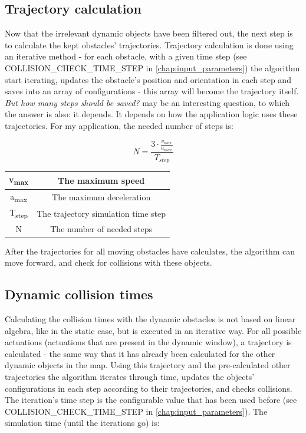 \subsection{Trajectory calculation}
\label{trajectory_calculation}
Now that the irrelevant dynamic objects have been filtered out, the next step is to calculate the kept obstacles' trajectories. Trajectory calculation is done using an iterative method - for each obstacle, with a given time step (see COLLISION\_CHECK\_TIME\_STEP in \ref{chap:input_parameters}) the algorithm start iterating, updates the obstacle's position and orientation in each step and saves into an array of configurations - this array will become the trajectory itself. \textit{But how many steps should be saved?} may be an interesting question, to which the answer is also: it depends. It depends on how the application logic uses these trajectories. For my application, the needed number of steps is:

\[ N = \frac{3 \cdot \frac{v_{max}}{a_{max}}}{T_{step}} \]

\begin{center}
    \begin{tabular}{ | c | c | }
        \hline
        v\textsubscript{max}	& The maximum speed    					\\
        \hline
        a\textsubscript{max}  	& The maximum deceleration      		\\
        \hline
        T\textsubscript{step}  	& The trajectory simulation time step	\\
        \hline
        N  						& The number of needed steps			\\
        \hline
    \end{tabular}
\end{center}

After the trajectories for all moving obstacles have calculates, the algorithm can move forward, and check for collisions with these objects.

\subsection{Dynamic collision times}
Calculating the collision times with the dynamic obstacles is not based on linear algebra, like in the static case, but is executed in an iterative way. For all possible actuations (actuations that are present in the dynamic window), a trajectory is calculated - the same way that it has already been calculated for the other dynamic objects in the map. Using this trajectory and the pre-calculated other trajectories the algorithm iterates through time, updates the objects' configurations in each step according to their trajectories, and checks collisions. The iteration's time step is the configurable value that has been used before (see COLLISION\_CHECK\_TIME\_STEP in \ref{chap:input_parameters}). The simulation time (until the iterations go) is:

